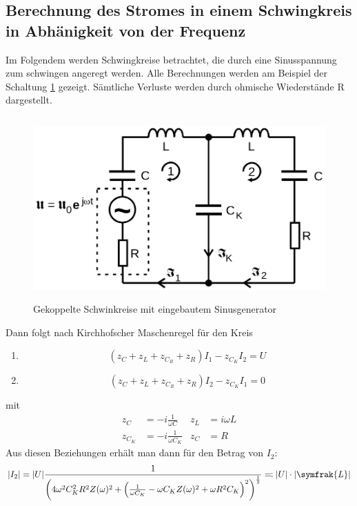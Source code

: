   \subsection{Berechnung des Stromes in einem Schwingkreis in Abhänigkeit von der Frequenz}
  Im Folgendem werden Schwingkreise betrachtet, die durch eine Sinusspannung zum schwingen angeregt werden. Alle Berechnungen werden am Beispiel der Schaltung \ref{fig:Abb4} gezeigt.
  Sämtliche Verluste werden durch ohmische Wiederstände R dargestellt.
  \begin{figure}
    \centering
    \includegraphics[height= 7cm]{./logos/Abb4.png}
    \caption{Gekoppelte Schwinkreise mit eingebautem Sinusgenerator}
    \label{fig:Abb4}
  \end{figure}
  Dann folgt nach Kirchhofscher Maschenregel  für den Kreis
  \begin{enumerate}
    \item
    \begin{equation}
        (z_C + z_L + z_{C_R} + z_R)I_1 - z_{C_K} I_2 = U
        \label{eqn:U1}
    \end{equation}
      \item
      \begin{equation}
          (z_C + z_L + z_{C_R} + z_R)I_2 - z_{C_K} I_1 = 0
          \label{eqn:U2}
      \end{equation}

  \end{enumerate}
  mit
  \begin{align*}
    z_C & =  -i \frac{1}{\omega C} & z_L & =  i\omega L \\
    z_{C_K} & = -i \frac{1}{\omega C_K} &  z_C & =  R
  \end{align*}
Aus diesen Beziehungen erhält man dann für den Betrag von $I_2$:
\begin{equation}
  \lvert I_2 \rvert = \lvert U \rvert \frac{1}{\left( 4\omega^2 C_{K}^2 R^2 Z(\omega)^2 + \left( \frac{1}{\omega C_K}-\omega C_K Z(\omega)^2 + \omega R^2 C_K\right)^2 \right)^{\frac{1}{2}}}
  \eqcolon \lvert U \rvert \cdot \lvert \symfrak{L} \rvert
  \label{eqn:UL}
\end{equation}
